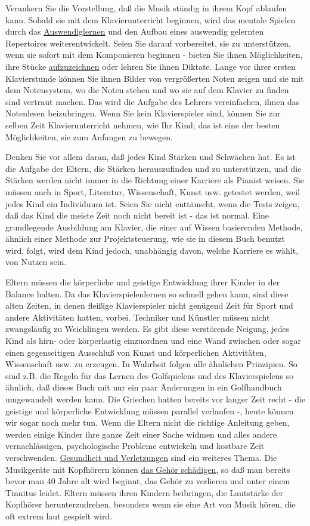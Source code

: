 Verankern Sie die Vorstellung, daß die Musik ständig in ihrem Kopf ablaufen kann.
Sobald sie mit dem Klavierunterricht beginnen, wird das mentale Spielen durch das \hyperref[c1iii6]{Auswendiglernen} und den Aufbau eines auswendig gelernten Repertoires weiterentwickelt.
Seien Sie darauf vorbereitet, sie zu unterstützen, wenn sie sofort mit dem Komponieren beginnen - bieten Sie ihnen Möglichkeiten, ihre Stücke \hyperref[c1iii13]{aufzuzeichnen} oder lehren Sie ihnen Diktate.
Lange vor ihrer ersten Klavierstunde können Sie ihnen Bilder von vergrößerten Noten zeigen und sie mit dem Notensystem, wo die Noten stehen und wo sie auf dem Klavier zu finden sind vertraut machen.
Das wird die Aufgabe des Lehrers vereinfachen, ihnen das Notenlesen beizubringen.
Wenn Sie kein Klavierspieler sind, können Sie zur selben Zeit Klavierunterricht nehmen, wie Ihr Kind; das ist eine der besten Möglichkeiten, sie zum Anfangen zu bewegen.

Denken Sie vor allem daran, daß jedes Kind Stärken und Schwächen hat.
Es ist die Aufgabe der Eltern, die Stärken herauszufinden und zu unterstützen, und die Stärken werden nicht immer in die Richtung einer Karriere als Pianist weisen.
Sie müssen auch in Sport, Literatur, Wissenschaft, Kunst usw. getestet werden, weil jedes Kind ein Individuum ist.
Seien Sie nicht enttäuscht, wenn die Tests zeigen, daß das Kind die meiste Zeit noch nicht bereit ist - das ist normal.
Eine grundlegende Ausbildung am Klavier, die einer auf Wissen basierenden Methode, ähnlich einer Methode zur Projektsteuerung, wie sie in diesem Buch benutzt wird, folgt, wird dem Kind jedoch, unabhängig davon, welche Karriere es wählt, von Nutzen sein.

Eltern müssen die körperliche und geistige Entwicklung ihrer Kinder in der Balance halten.
Da das Klavierspielenlernen so schnell gehen kann, sind diese alten Zeiten, in denen fleißige Klavierspieler nicht genügend Zeit für Sport und andere Aktivitäten hatten, vorbei.
Techniker und Künstler müssen nicht zwangsläufig zu Weichlingen werden.
Es gibt diese verstörende Neigung, jedes Kind als hirn- oder körperlastig einzuordnen und eine Wand zwischen oder sogar einen gegenseitigen Ausschluß von Kunst und körperlichen Aktivitäten, Wissenschaft usw. zu erzeugen.
In Wahrheit folgen alle ähnlichen Prinzipien.
So sind z.B. die Regeln für das Lernen des Golfspielens und des Klavierspielens so ähnlich, daß dieses Buch mit nur ein paar Änderungen in ein Golfhandbuch umgewandelt werden kann.
Die Griechen hatten bereits vor langer Zeit recht - die geistige und körperliche Entwicklung müssen parallel verlaufen -, heute können wir sogar noch mehr tun.
Wenn die Eltern nicht die richtige Anleitung geben, werden einige Kinder ihre ganze Zeit einer Sache widmen und alles andere vernachlässigen, psychologische Probleme entwickeln und kostbare Zeit verschwenden.
\hyperref[c1iii10krank]{Gesundheit und Verletzungen} sind ein weiteres Thema.
Die Musikgeräte mit Kopfhörern können \hyperref[c1iii10gehoer]{das Gehör schädigen}, so daß man bereits bevor man 40 Jahre alt wird beginnt, das Gehör zu verlieren und unter einem Tinnitus leidet.
Eltern müssen ihren Kindern beibringen, die Lautstärke der Kopfhörer herunterzudrehen, besonders wenn sie eine Art von Musik hören, die oft extrem laut gespielt wird.
 

